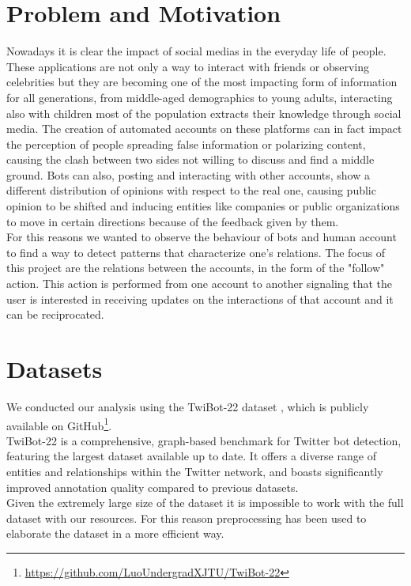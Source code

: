 \documentclass[12pt, a4paper]{article}
\begin{document}
\section{Problem and Motivation}
	\label{problem-and-motivation}
    Nowadays it is clear the impact of social medias in the everyday life of people. These applications are not only a way to interact with friends or observing celebrities but they are becoming one of the most impacting form of information for all generations, from middle-aged demographics to young adults, interacting also with children most of the population extracts their knowledge through social media. The creation of automated accounts on these platforms can in fact impact the perception of people spreading false information or polarizing content, causing the clash between two sides not willing to discuss and find a middle ground. Bots can also, posting and interacting with other accounts, show a different distribution of opinions with respect to the real one, causing public opinion to be shifted and inducing entities like companies or public organizations to move in certain directions because of the feedback given by them.\\
    For this reasons we wanted to observe the behaviour of bots and human account to find a way to detect patterns that characterize one's relations. The focus of this project are the relations between the accounts, in the form of the "follow" action. This action is performed from one account to another signaling that the user is interested in receiving updates on the interactions of that account and it can be reciprocated.


\section{Datasets}
	\label{datasets}
	We conducted our analysis using the TwiBot-22 dataset \cite{twibot22}, which is publicly available on GitHub\footnote{\href{https://github.com/LuoUndergradXJTU/TwiBot-22}{https://github.com/LuoUndergradXJTU/TwiBot-22}}.\\
	TwiBot-22 is a comprehensive, graph-based benchmark for Twitter bot detection, featuring the largest dataset available up to date. It offers a diverse range of entities and relationships within the Twitter network, and boasts significantly improved annotation quality compared to previous datasets.\\
	Given the extremely large size of the dataset it is impossible to work with the full dataset with our resources. For this reason preprocessing has been used to elaborate the dataset in a more efficient way.
\end{document}
